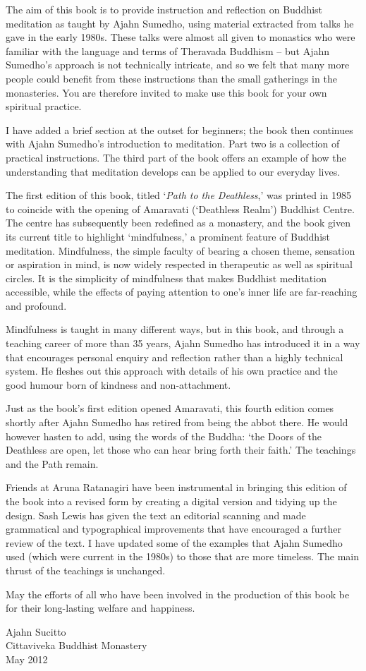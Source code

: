 
The aim of this book is to provide instruction and reflection on Buddhist meditation as taught by Ajahn Sumedho, using material extracted from talks he gave in the early 1980s. These talks were almost all given to monastics who were familiar with the language and terms of Theravada Buddhism – but Ajahn Sumedho's approach is not technically intricate, and so we felt that many more people could benefit from these instructions than the small gatherings in the monasteries. You are therefore invited to make use this book for your own spiritual practice.

I have added a brief section at the outset for beginners; the book then continues with Ajahn Sumedho's introduction to meditation. Part two is a collection of practical instructions. The third part of the book offers an example of how the understanding that meditation develops can be applied to our everyday lives.

The first edition of this book, titled `\textit{Path to the Deathless},' was printed in 1985 to coincide with the opening of Amaravati (`Deathless Realm') Buddhist Centre. The centre has subsequently been redefined as a monastery, and the book given its current title to highlight `mindfulness,' a prominent feature of Buddhist meditation. Mindfulness, the simple faculty of bearing a chosen theme, sensation or aspiration in mind, is now widely respected in therapeutic as well as spiritual circles. It is the simplicity of mindfulness that makes Buddhist meditation accessible, while the effects of paying attention to one's inner life are far-reaching and profound.

Mindfulness is taught in many different ways, but in this book, and through a teaching career of more than 35 years, Ajahn Sumedho has introduced it in a way that encourages personal enquiry and reflection rather than a highly technical system. He fleshes out this approach with details of his own practice and the good humour born of kindness and non-attachment.

Just as the book's first edition opened Amaravati, this fourth edition comes shortly after Ajahn Sumedho has retired from being the abbot there. He would however hasten to add, using the words of the Buddha: `the Doors of the Deathless are open, let those who can hear bring forth their faith.' The teachings and the Path remain.

Friends at Aruna Ratanagiri have been instrumental in bringing this edition of the book into a revised form by creating a digital version and tidying up the design. Sash Lewis has given the text an editorial scanning and made grammatical and typographical improvements that have encouraged a further review of the text. I have updated some of the examples that Ajahn Sumedho used (which were current in the 1980s) to those that are more timeless. The main thrust of the teachings is unchanged.

May the efforts of all who have been involved in the production of this book be for their long-lasting welfare and happiness.

\bigskip
{\par\raggedleft
Ajahn Sucitto\\
Cittaviveka Buddhist Monastery\\
May 2012
\par}

